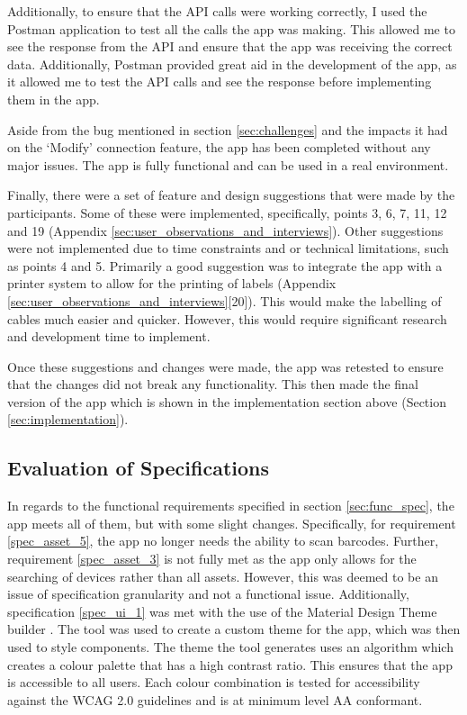 \documentclass [11pt,a4paper]{article}
\begin{document}
Additionally, to ensure that the API calls were working correctly, I used the Postman application to test all the calls the app was making. This allowed me to see the response from the API and ensure that the app was receiving the correct data. Additionally, Postman provided great aid in the development of the app, as it allowed me to test the API calls and see the response before implementing them in the app.

Aside from the bug mentioned in section \ref{sec:challenges} and the impacts it had on the `Modify' connection feature, the app has been completed without any major issues. The app is fully functional and can be used in a real environment. 

Finally, there were a set of feature and design suggestions that were made by the participants. Some of these were implemented, specifically, points 3, 6, 7, 11, 12 and 19 (Appendix \ref{sec:user_observations_and_interviews}). Other suggestions were not implemented due to time constraints and or technical limitations, such as points 4 and 5. Primarily a good suggestion was to integrate the app with a printer system to allow for the printing of labels (Appendix \ref{sec:user_observations_and_interviews}[20]). This would make the labelling of cables much easier and quicker. However, this would require significant research and development time to implement.

Once these suggestions and changes were made, the app was retested to ensure that the changes did not break any functionality. This then made the final version of the app which is shown in the implementation section above (Section \ref{sec:implementation}).

\subsection{Evaluation of Specifications}
\label{sec:eval_specifications}

In regards to the functional requirements specified in section \ref{sec:func_spec}, the app meets all of them, but with some slight changes. Specifically, for requirement \ref{spec_asset_5}, the app no longer needs the ability to scan barcodes. Further, requirement \ref{spec_asset_3} is not fully met as the app only allows for the searching of devices rather than all assets. However, this was deemed to be an issue of specification granularity and not a functional issue. Additionally, specification \ref{spec_ui_1} was met with the use of the Material Design Theme builder \cite{material3ColourTool}. The tool was used to create a custom theme for the app, which was then used to style components. The theme the tool generates uses an algorithm which creates a colour palette that has a high contrast ratio. This ensures that the app is accessible to all users. Each colour combination is tested for accessibility against the WCAG 2.0 guidelines \cite{caldwell2008web} and is at minimum level AA conformant.
\end{document}

